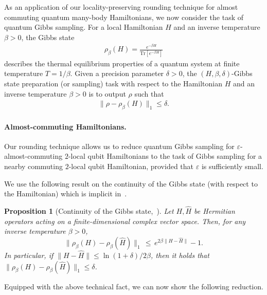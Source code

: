 \documentclass[a4paper,onecolumn,11pt]{quantumarticle}
\theoremstyle{plain}
\newtheorem{proposition}{Proposition}
\newcommand{\eps}{\varepsilon}
\begin{document}
As an application of our locality-preserving rounding technique for almost commuting quantum many-body Hamiltonians, we now consider the task of quantum Gibbs sampling.
For a local Hamiltonian $H$ and an inverse temperature $\beta > 0$, the Gibbs state 
\begin{align}\label{eq:Gibbs-state}
\rho_\beta(H) = \frac{e^{-\beta H}}{\mathrm{Tr}\left[e^{-\beta H}\right]}    
\end{align}
describes the thermal equilibrium properties of a quantum system at finite temperature $T=1/\beta$.
Given a precision parameter $\delta >0$, the $(H,\beta,\delta)$-Gibbs state preparation (or sampling) task with respect to the Hamiltonian $H$ and an inverse temperature $\beta > 0$ is to output $\rho$ such that
\begin{align}
\| \rho - \rho_\beta(H) \|_1 \leq \delta.    
\end{align}

\paragraph{Almost-commuting Hamiltonians.}

Our rounding technique allows us to reduce quantum Gibbs sampling for 
$\eps$-almost-commuting $2$-local qubit Hamiltonians
to the task of Gibbs sampling for a nearby commuting $2$-local qubit Hamiltonian, provided that $\eps$ is sufficiently small.

We use the following result on the continuity of the Gibbs state (with respect to the Hamiltonian) which is implicit in~\cite[Proposition 15]{Capel_2025}.
\begin{proposition}[Continuity of the Gibbs state,~\cite{Capel_2025}]\label{prop:continuity}
Let $H,\hat{H}$ be Hermitian operators acting on a finite-dimensional complex vector space. Then, for any inverse temperature $\beta > 0$,
$$
\| \rho_\beta(H) - \rho_\beta(\hat{H})\|_1 \, \leq \, e^{2 \beta \| H - \hat{H} \|} -1.
$$
In particular, if $\|H-\hat{H}\| \leq \ln(1+\delta)/2\beta$, then it holds that $\|\rho_\beta(H) - \rho_\beta(\hat{H})\|_1 \leq \delta$.
\end{proposition}

Equipped with the above technical fact, we can now show the following reduction.
\end{document}
